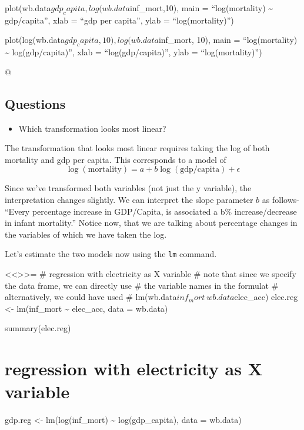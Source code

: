 \documentclass[
]{article}
\begin{document}
plot(wb.data\(gdp_capita, log(wb.data\)inf\_mort,10), main =
``log(mortality) \textasciitilde{} gdp/capita'', xlab = ``gdp per
capita'', ylab = ``log(mortality)'')

plot(log(wb.data\(gdp_capita, 10), log(wb.data\)inf\_mort, 10), main =
``log(mortality) \textasciitilde{} log(gdp/capita)'', xlab =
``log(gdp/capita)'', ylab = ``log(mortality)'')

@

\subsection*{Questions}
\begin{itemize}
\item Which transformation looks most linear?
\end{itemize}

The transformation that looks most linear requires taking the log of
both mortality and gdp per capita. This corresponds to a model of
\begin{equation}
\log(\text{mortality}) = a + b\log(\text{gdp/capita}) + \epsilon
\end{equation}

Since we've transformed both variables (not just the y variable), the
interpretation changes slightly. We can interpret the slope parameter
\(b\) as follows- ``Every percentage increase in GDP/Capita, is
associated a b\% increase/decrease in infant mortality.'' Notice now,
that we are talking about percentage changes in the variables of which
we have taken the log.

Let's estimate the two models now using the \texttt{lm} command.

\textless\textless\textgreater\textgreater= \# regression with
electricity as X variable \# note that since we specify the data frame,
we can directly use \# the variable names in the formulat \#
alternatively, we could have used \#
lm(wb.data\(inf_mort ~ wb.data\)elec\_acc) elec.reg \textless-
lm(inf\_mort \textasciitilde{} elec\_acc, data = wb.data)

summary(elec.reg)

\hypertarget{regression-with-electricity-as-x-variable}{%
\section{regression with electricity as X
variable}\label{regression-with-electricity-as-x-variable}}

gdp.reg \textless- lm(log(inf\_mort) \textasciitilde{} log(gdp\_capita),
data = wb.data)
\end{document}
